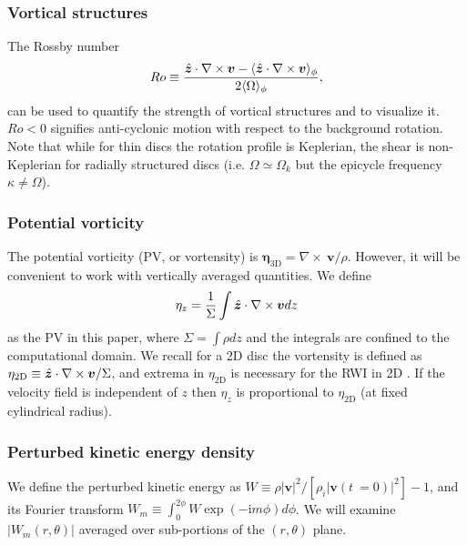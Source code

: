 \subsubsection{Vortical structures}
The Rossby number
\begin{align}
  Ro \equiv
  \frac{\hat{\bm{z}}\cdot\nabla\times\bm{v}-\langle \hat{\bm{z}}\cdot\nabla\times\bm{v} \rangle_\phi}{2\langle \Omega \rangle_\phi},   
\end{align} 
can be used to quantify the strength of vortical structures and to
visualize it. $Ro<0$ signifies anti-cyclonic motion with respect to
the background rotation. Note that while for thin discs 
the rotation profile is Keplerian, the shear is non-Keplerian for radially  
structured discs (i.e. $\Omega\simeq\Omega_k$ but the epicycle
frequency $\kappa\neq\Omega$). 

\subsubsection{Potential vorticity}
The potential vorticity (PV, or vortensity) is 
$  \bm{\eta}_\mathrm{3D} = \nabla\times~\bm{v}/\rho$. 
However, it will be convenient to work with vertically averaged
quantities. We define  
\begin{align}
  \eta_z = \frac{1}{\Sigma}\int \hat{\bm{z}}\cdot\nabla\times\bm{v} dz
\end{align}
as the PV in this paper, where $\Sigma = \int\rho dz$ and the
integrals are confined to the computational domain. 
We recall for a 2D disc the vortensity is defined as 
$\eta_\mathrm{2D} \equiv \hat{\bm{z}}\cdot\nabla\times\bm{v}/\Sigma$, and
extrema in $\eta_\mathrm{2D}$ is necessary for the RWI in
2D \citep{lovelace99,lin10}. If the velocity field is independent of 
$z$ then $\eta_z$ is proportional to $\eta_\mathrm{2D}$ (at fixed
cylindrical radius).    

\subsubsection{Perturbed kinetic energy density}  
We define the perturbed kinetic energy as
$W\equiv\rho|\bm{v}|^2/[\rho_i|\bm{v}(t~=0)|^2] - 1$, and its Fourier transform 
$W_m\equiv\int_0^{2\phi} W\exp{(-\mathrm{i}m\phi)}d\phi$. We will examine
$|W_m(r,\theta)|$ averaged over sub-portions of the $(r,\theta)$
plane. 
